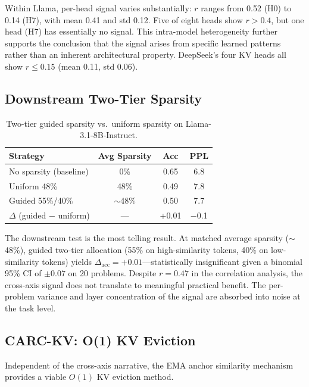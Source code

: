 \documentclass[11pt]{article}
\begin{document}
Within Llama, per-head signal varies substantially: $r$ ranges from 0.52 (H0) to 0.14 (H7), with mean 0.41 and std 0.12. Five of eight heads show $r{>}0.4$, but one head (H7) has essentially no signal. This intra-model heterogeneity further supports the conclusion that the signal arises from specific learned patterns rather than an inherent architectural property. DeepSeek's four KV heads all show $r{\leq}0.15$ (mean 0.11, std 0.06).

\subsection{Downstream Two-Tier Sparsity}

\begin{table}[h]
\centering
\caption{Two-tier guided sparsity vs.\ uniform sparsity on Llama-3.1-8B-Instruct.}
\label{tab:twotier}
\small
\begin{tabular}{@{}lccc@{}}
\toprule
Strategy & Avg Sparsity & Acc & PPL \\
\midrule
No sparsity (baseline) & 0\% & 0.65 & 6.8 \\
Uniform 48\% & 48\% & 0.49 & 7.8 \\
Guided 55\%/40\% & $\sim$48\% & 0.50 & 7.7 \\
$\Delta$ (guided $-$ uniform) & --- & +0.01 & $-$0.1 \\
\bottomrule
\end{tabular}
\end{table}

The downstream test is the most telling result. At matched average sparsity ($\sim$48\%), guided two-tier allocation (55\% on high-similarity tokens, 40\% on low-similarity tokens) yields $\Delta_\text{acc}{=}{+}0.01$---statistically insignificant given a binomial 95\% CI of ${\pm}0.07$ on 20 problems. Despite $r{=}0.47$ in the correlation analysis, the cross-axis signal does not translate to meaningful practical benefit. The per-problem variance and layer concentration of the signal are absorbed into noise at the task level.

\subsection{CARC-KV: O(1) KV Eviction}

Independent of the cross-axis narrative, the EMA anchor similarity mechanism provides a viable $O(1)$ KV eviction method.
\end{document}
